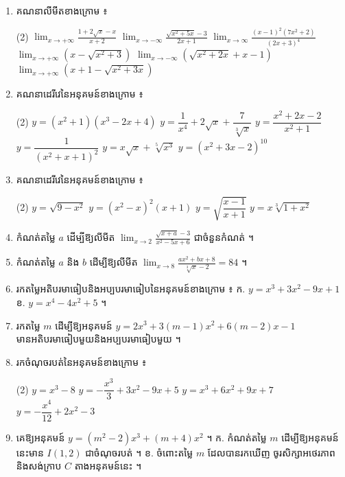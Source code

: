 \begin{enumerate}[1]
\begin{tasks}
  \end{tasks}
  \item គណនាលីមីតខាងក្រោម ៖
  \begin{tasks}(2)
    \task $\displaystyle\lim_{x \to +\infty}\frac{1 + 2\sqrt{x} - x}{x + 2}$
    \task $\displaystyle\lim_{x \to -\infty}\frac{\sqrt{x^2 + 5x} - 3}{2x + 1}$
    \task $\displaystyle\lim_{x \to \infty}\frac{(x - 1)^2(7x^2 + 2)}{(2x + 3)^4}$
    \task $\displaystyle\lim_{x \to +\infty}(x - \sqrt{x^2 + 3})$
    \task $\displaystyle\lim_{x \to -\infty}(\sqrt{x^2 + 2x} + x - 1)$
    \task $\displaystyle\lim_{x \to +\infty}(x + 1 - \sqrt{x^2 + 3x})$
  \end{tasks}
  \item គណនាដេរីវេនៃអនុគមន៍ខាងក្រោម ៖
  \begin{tasks}(2)
    \task $y = (x^2 + 1)(x^3 - 2x + 4)$
    \task $y = \dfrac{1}{x^4} + 2\sqrt{x} + \dfrac{7}{\sqrt[3]{x}}$
    \task $y = \dfrac{x^2 + 2x - 2}{x^2 + 1}$
    \task $y = \dfrac{1}{(x^2 + x + 1)^2}$
    \task $y = x\sqrt{x} + \sqrt[5]{x^3}$
    \task $y = (x^2 + 3x - 2)^{10}$
  \end{tasks}
  \item គណនាដេរីវេនៃអនុគមន៍ខាងក្រោម ៖
  \begin{tasks}(2)
    \task $y = \sqrt{9 - x^2}$
    \task $y = (x^2 - x)^2(x + 1)$
    \task $y = \sqrt{\dfrac{x - 1}{x + 1}}$
    \task $y = x\sqrt[3]{1 + x^2}$
  \end{tasks}
  \item កំណត់តម្លៃ $a$ ដើម្បីឱ្យលីមីត $\displaystyle\lim_{x \to 2}\frac{\sqrt{x + a} - 3}{x^2 - 5x + 6}$ ជាចំនួនកំណត់ ។
  \item កំណត់តម្លៃ $a$ និង $b$ ដើម្បីឱ្យលីមីត $\displaystyle\lim_{x \to 8}\frac{ax^2 + bx + 8}{\sqrt[3]{x} - 2} = 84$ ។
  \item រកតម្លៃអតិបរមាធៀបនិងអប្បបរមាធៀបនៃអនុគមន៍ខាងក្រោម ៖ \quad ក. $y = x^3 + 3x^2 - 9x + 1$ \quad ខ. $y = x^4 - 4x^2 + 5$ ។
  \item រកតម្លៃ $m$ ដើម្បីឱ្យអនុគមន៍ $y = 2x^3 + 3(m - 1)x^2 + 6(m - 2)x - 1$ មានអតិបរមាធៀបមួយនិងអប្បបរមាធៀបមួយ ។
  \item រកចំណុចរបត់នៃអនុគមន៍ខាងក្រោម ៖
  \begin{tasks}(2)
    \task $y = x^3 - 8$
    \task $y = -\dfrac{x^3}{3} + 3x^2 - 9x + 5$
    \task $y = x^3 + 6x^2 + 9x + 7$
    \task $y = -\dfrac{x^4}{12} + 2x^2 - 3$
  \end{tasks}
  \item គេឱ្យអនុគមន៍ $y = (m^2 - 2)x^3 + (m + 4)x^2$ ។ \quad ក. កំណត់តម្លៃ $m$ ដើម្បីឱ្យអនុគមន៍នេះមាន $I(1, 2)$ ជាចំណុចរបត់ ។ \quad ខ. ចំពោះតម្លៃ $m$ ដែលបានរកឃើញ ចូរសិក្សាអថេរភាពនិងសង់ក្រាប $C$ តាងអនុគមន៍នេះ ។

\end{enumerate}
